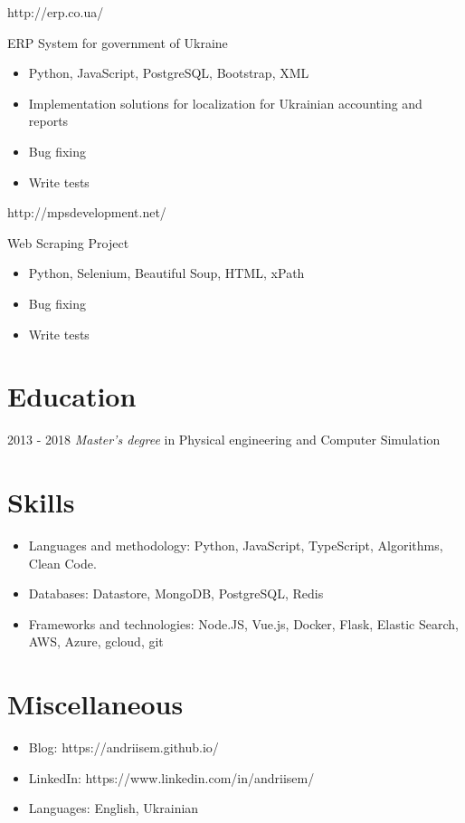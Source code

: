 \documentclass{resume}
\begin{document}
http://erp.co.ua/

ERP System for government of Ukraine 
\begin{itemize}
  \item Python, JavaScript, PostgreSQL, Bootstrap, XML
  \item Implementation solutions for localization for Ukrainian accounting and reports
  \item Bug fixing
  \item Write tests
\end{itemize}


http://mpsdevelopment.net/

Web Scraping Project
\begin{itemize}
  \item Python, Selenium, Beautiful Soup, HTML, xPath
  \item Bug fixing
  \item Write tests
\end{itemize}

\section{Education}
 {2013 - 2018}
\textit{Master's degree} in Physical engineering and Computer Simulation



\section{Skills}
\begin{itemize}[parsep=0.5ex]
    \item Languages and methodology: Python, JavaScript, TypeScript, Algorithms, Clean Code.
    \item Databases: Datastore, MongoDB, PostgreSQL, Redis
    \item Frameworks and technologies: Node.JS, Vue.js, Docker, Flask, Elastic Search, AWS, Azure, gcloud, git
\end{itemize}

\section{Miscellaneous}
\begin{itemize}[parsep=0.5ex]
  \item Blog: https://andriisem.github.io/
  \item LinkedIn: https://www.linkedin.com/in/andriisem/
  \item Languages: English, Ukrainian
\end{itemize}
\end{document}
